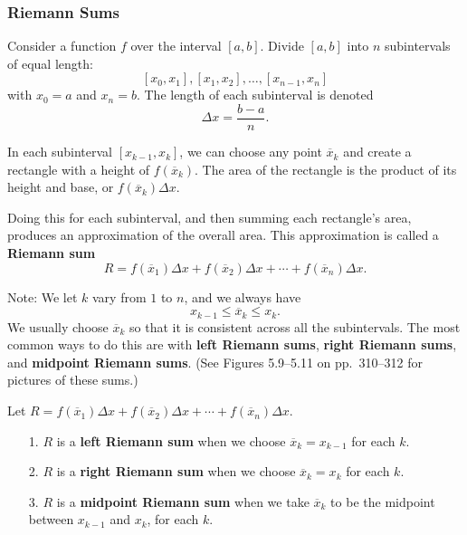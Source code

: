 \documentclass[14pt]{beamer}
\begin{document}
\begin{frame}
\frametitle{\small Riemann Sums}
\small


Consider a function $f$ over the interval $[a,b]$.  Divide $[a,b]$ into $n$ subintervals of equal length:
\[[x_0,x_1], [x_1,x_2], \dots, [x_{n-1},x_n]\]
with $x_0=a$ and $x_n=b$.  The length of each subinterval is denoted
\[\Delta x = \frac{b-a}{n}.\]
\end{frame}

\begin{frame}
\small
In each subinterval $[x_{k-1}, x_k]$, we can choose any point $\overline{x}_k$ and create a rectangle with a height of $f(\overline{x}_k)$.
The area of the rectangle is the product of its height and base, or $f(\overline{x}_k)\Delta x$.

\vspace{1pc}
Doing this for each subinterval, and then summing each rectangle's area, produces an approximation of the overall area.  This approximation is called a {\bf Riemann sum}
\[R=f(\overline{x}_1)\Delta x + f(\overline{x}_2)\Delta x + \cdots + f(\overline{x}_n)\Delta x.\]
\end{frame}

\begin{frame}
\footnotesize
Note:  We let $k$ vary from $1$ to $n$, and we always have 
\[x_{k-1}\leq \overline x_k\leq x_k.\]  
We usually choose $\overline{x}_k$ so that it is consistent across all the subintervals.  The most common ways to do this are with {\bf left Riemann sums}, {\bf right Riemann sums}, and {\bf midpoint Riemann sums}.  (See Figures 5.9--5.11 on pp.\ 310--312 for pictures of these sums.)

\vspace{1pc}
Let $R=f(\overline{x}_1)\Delta x + f(\overline{x}_2)\Delta x + \cdots + f(\overline{x}_n)\Delta x$.
\begin{itemize}
\item[1.] $R$ is a {\bf left Riemann sum} when we choose $\overline x_k=x_{k-1}$ for each $k$.  
\item[2.] $R$ is a {\bf right Riemann sum} when we choose $\overline x_k=x_k$ for each $k$.
\item[3.] $R$ is a {\bf midpoint Riemann sum} when we take $\overline x_k$ to be the midpoint between $x_{k-1}$ and $x_k$, for each $k$.  
\end{itemize}
\end{frame}
\end{document}
